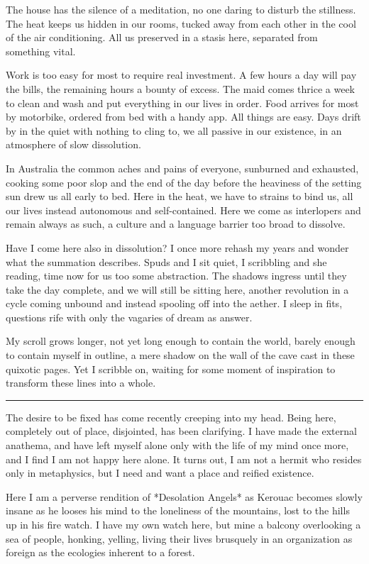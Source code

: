 \documentclass[ebook, 10pt, openright, onecolumn]{memoir}
\newcommand*\starbreak{\fancybreak*{\Large{* * *}}}
\begin{document}
The house has the silence of a meditation, no one daring to disturb the
stillness.  The heat keeps us hidden in our rooms, tucked away from each other
in the cool of the air conditioning. All us preserved in a stasis here,
separated from something vital.

Work is too easy for most to require real investment.  A few hours a day will
pay the bills, the remaining hours a bounty of excess.  The maid comes thrice a
week to clean and wash and put everything in our lives in order.  Food arrives
for most by motorbike, ordered from bed with a handy app.  All things are easy.
Days drift by in the quiet with nothing to cling to, we all passive in our
existence, in an atmosphere of slow dissolution.

In Australia the common aches and pains of everyone, sunburned and exhausted,
cooking some poor slop and the end of the day before the heaviness of the
setting sun drew us all early to bed.  Here in the heat, we have to strains to
bind us, all our lives instead autonomous and self-contained.  Here we come as
interlopers and remain always as such, a culture and a language barrier too
broad to dissolve.

Have I come here also in dissolution?  I once more rehash my years and wonder
what the summation describes.  Spuds and I sit quiet, I scribbling and she
reading, time now for us too some abstraction.  The shadows ingress until they
take the day complete, and we will still be sitting here, another revolution in
a cycle coming unbound and instead spooling off into the aether.  I sleep in
fits, questions rife with only the vagaries of dream as answer.

My scroll grows longer, not yet long enough to contain the world, barely enough
to contain myself in outline, a mere shadow on the wall of the cave cast in
these quixotic pages.  Yet I scribble on, waiting for some moment of inspiration
to transform these lines into a whole.

\starbreak

The desire to be fixed has come recently creeping into my head.  Being here,
completely out of place, disjointed, has been clarifying.  I have made the
external anathema, and have left myself alone only with the life of my mind once
more, and I find I am not happy here alone.  It turns out, I am not a hermit who
resides only in metaphysics, but I need and want a place and reified existence.

Here I am a perverse rendition of *Desolation Angels* as Kerouac becomes slowly
insane as he looses his mind to the loneliness of the mountains, lost to the
hills up in his fire watch.  I have my own watch here, but mine a balcony
overlooking a sea of people, honking, yelling, living their lives brusquely in
an organization as foreign as the ecologies inherent to a forest.
\end{document}
